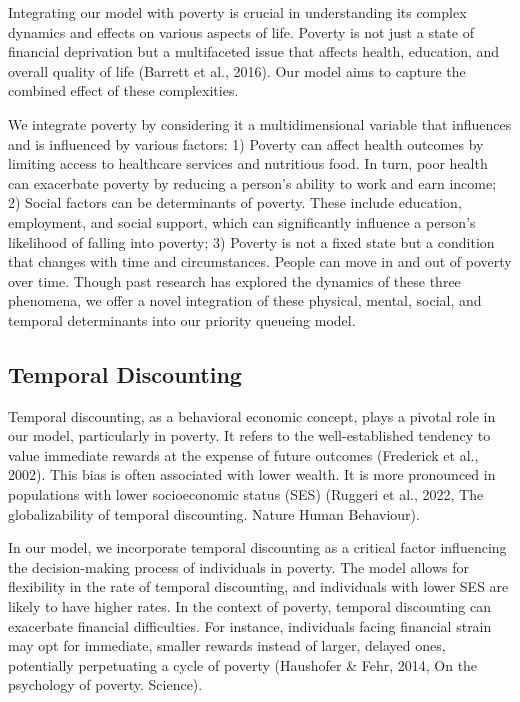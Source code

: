\documentclass[
]{report}
\begin{document}
Integrating our model with poverty is crucial in understanding its
complex dynamics and effects on various aspects of life. Poverty is not
just a state of financial deprivation but a multifaceted issue that
affects health, education, and overall quality of life (Barrett et al.,
2016). Our model aims to capture the combined effect of these
complexities.

We integrate poverty by considering it a multidimensional variable that
influences and is influenced by various factors: 1) Poverty can affect
health outcomes by limiting access to healthcare services and nutritious
food. In turn, poor health can exacerbate poverty by reducing a person's
ability to work and earn income; 2) Social factors can be determinants
of poverty. These include education, employment, and social support,
which can significantly influence a person's likelihood of falling into
poverty; 3) Poverty is not a fixed state but a condition that changes
with time and circumstances. People can move in and out of poverty over
time. Though past research has explored the dynamics of these three
phenomena, we offer a novel integration of these physical, mental,
social, and temporal determinants into our priority queueing model.

\hypertarget{temporal-discounting}{%
\subsection{Temporal Discounting}\label{temporal-discounting}}

Temporal discounting, as a behavioral economic concept, plays a pivotal
role in our model, particularly in poverty. It refers to the
well-established tendency to value immediate rewards at the expense of
future outcomes (Frederick et al., 2002). This bias is often associated
with lower wealth. It is more pronounced in populations with lower
socioeconomic status (SES) (Ruggeri et al., 2022, The globalizability of
temporal discounting. Nature Human Behaviour).

In our model, we incorporate temporal discounting as a critical factor
influencing the decision-making process of individuals in poverty. The
model allows for flexibility in the rate of temporal discounting, and
individuals with lower SES are likely to have higher rates. In the
context of poverty, temporal discounting can exacerbate financial
difficulties. For instance, individuals facing financial strain may opt
for immediate, smaller rewards instead of larger, delayed ones,
potentially perpetuating a cycle of poverty (Haushofer \& Fehr, 2014, On
the psychology of poverty. Science).
\end{document}
